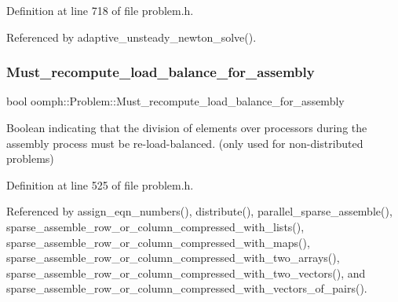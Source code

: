 Definition at line 718 of file problem.\+h.



Referenced by adaptive\+\_\+unsteady\+\_\+newton\+\_\+solve().

\mbox{\label{classoomph_1_1Problem_aab187e716f470b32a01d7f0cee7f3bf4}} 
\subsubsection{\texorpdfstring{Must\+\_\+recompute\+\_\+load\+\_\+balance\+\_\+for\+\_\+assembly}{Must\_recompute\_load\_balance\_for\_assembly}}
{\footnotesize\ttfamily bool oomph\+::\+Problem\+::\+Must\+\_\+recompute\+\_\+load\+\_\+balance\+\_\+for\+\_\+assembly\hspace{0.3cm}{\ttfamily [private]}}



Boolean indicating that the division of elements over processors during the assembly process must be re-\/load-\/balanced. (only used for non-\/distributed problems) 



Definition at line 525 of file problem.\+h.



Referenced by assign\+\_\+eqn\+\_\+numbers(), distribute(), parallel\+\_\+sparse\+\_\+assemble(), sparse\+\_\+assemble\+\_\+row\+\_\+or\+\_\+column\+\_\+compressed\+\_\+with\+\_\+lists(), sparse\+\_\+assemble\+\_\+row\+\_\+or\+\_\+column\+\_\+compressed\+\_\+with\+\_\+maps(), sparse\+\_\+assemble\+\_\+row\+\_\+or\+\_\+column\+\_\+compressed\+\_\+with\+\_\+two\+\_\+arrays(), sparse\+\_\+assemble\+\_\+row\+\_\+or\+\_\+column\+\_\+compressed\+\_\+with\+\_\+two\+\_\+vectors(), and sparse\+\_\+assemble\+\_\+row\+\_\+or\+\_\+column\+\_\+compressed\+\_\+with\+\_\+vectors\+\_\+of\+\_\+pairs().

\mbox{\label{classoomph_1_1Problem_a94536b381e949edf5bb4d44434e08925}} 
